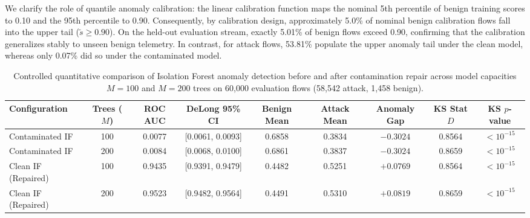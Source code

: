 \documentclass[journal,10pt,onecolumn]{IEEEtran}
\begin{document}
We clarify the role of quantile anomaly calibration: the linear calibration function maps the nominal 5th percentile of benign training scores to 0.10 and the 95th percentile to 0.90. Consequently, by calibration design, approximately 5.0\% of nominal benign calibration flows fall into the upper tail ($\tilde{s} \ge 0.90$). On the held-out evaluation stream, exactly 5.01\% of benign flows exceed 0.90, confirming that the calibration generalizes stably to unseen benign telemetry. In contrast, for attack flows, 53.81\% populate the upper anomaly tail under the clean model, whereas only 0.07\% did so under the contaminated model.

\begin{table}[t]
\caption{Controlled quantitative comparison of Isolation Forest anomaly detection before and after contamination repair across model capacities $M=100$ and $M=200$ trees on 60,000 evaluation flows (58,542 attack, 1,458 benign).}
\label{tab:if_controlled}
\centering
\small
\begin{tabular}{lcccccccc}
\toprule
\textbf{Configuration} & \textbf{Trees ($M$)} & \textbf{ROC AUC} & \textbf{DeLong 95\% CI} & \textbf{Benign Mean} & \textbf{Attack Mean} & \textbf{Anomaly Gap} & \textbf{KS Stat $D$} & \textbf{KS $p$-value} \\
\midrule
Contaminated IF & 100 & 0.0077 & [0.0061, 0.0093] & 0.6858 & 0.3834 & $-0.3024$ & 0.8564 & $< 10^{-15}$ \\
Contaminated IF & 200 & 0.0084 & [0.0068, 0.0100] & 0.6861 & 0.3837 & $-0.3024$ & 0.8659 & $< 10^{-15}$ \\
Clean IF (Repaired) & 100 & 0.9435 & [0.9391, 0.9479] & 0.4482 & 0.5251 & $+0.0769$ & 0.8564 & $< 10^{-15}$ \\
Clean IF (Repaired) & 200 & 0.9523 & [0.9482, 0.9564] & 0.4491 & 0.5310 & $+0.0819$ & 0.8659 & $< 10^{-15}$ \\
\bottomrule
\end{tabular}
\end{table}
\end{document}
